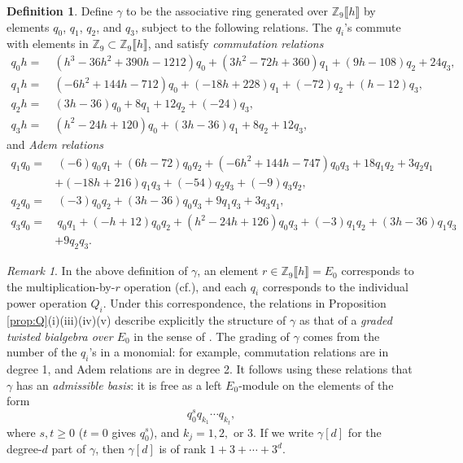 \documentclass{gtpart}
\theoremstyle{definition}
\newtheorem{defn}[thm]{Definition}
\theoremstyle{remark}
\newtheorem{rmk}[thm]{Remark}
\newcommand{\mb}[1]{\mathbb{#1}}
\newcommand{\cf}{cf.\thinspace}
\newcommand{\BZ}{{\mb Z}}
\newcommand{\g}{\gamma}
\begin{document}
\begin{defn}
\label{def:gamma}
 Define $\g$ to be the associative ring generated over $\BZ_9 \llbracket h \rrbracket$ by elements $q_0$, $q_1$, $q_2$, and $q_3$, subject to the following relations.  
 The $q_i$'s commute with elements in $\BZ_9 \subset \BZ_9 \llbracket h \rrbracket$, and satisfy {\em commutation relations} 
 \begin{equation*}
 \begin{split}
  q_0 h = & ~ (h^3 - 36 h^2 + 390 h - 1212) q_0 + (3 h^2 - 72 h + 360) q_1 + (9 h - 108) q_2 + 24 q_3, \\
  q_1 h = & ~ (-6 h^2 + 144 h - 712) q_0 + (-18 h + 228) q_1 + (-72) q_2 + (h - 12) q_3, \\
  q_2 h = & ~ (3 h - 36) q_0 + 8 q_1 + 12 q_2 + (-24) q_3, \\
  q_3 h = & ~ (h^2 - 24 h + 120) q_0 + (3 h - 36) q_1 + 8 q_2 + 12 q_3, 
 \end{split}
 \end{equation*}
 and {\em Adem relations} 
 \begin{equation*}
 \begin{split}
  q_1q_0 = & ~ (-6) q_0q_1 + (6 h - 72) q_0q_2 + (-6 h^2 + 144 h - 747) q_0q_3 + 18 q_1q_2 + 3 q_2q_1 \\
           & + (-18 h + 216) q_1q_3 + (-54) q_2q_3 + (-9) q_3q_2, \\
  q_2q_0 = & ~ (-3) q_0q_2 + (3 h - 36) q_0q_3 + 9 q_1q_3 + 3 q_3q_1, \\
  q_3q_0 = & ~ q_0q_1 + (-h + 12) q_0q_2 + (h^2 - 24 h + 126) q_0q_3 + (-3) q_1q_2 + (3 h - 36) q_1q_3 \\
           & + 9 q_2q_3.  
 \end{split}
 \end{equation*}
\end{defn}

\begin{rmk}
\label{rmk:rank}
 In the above definition of $\g$, an element $r \in \BZ_9 \llbracket h \rrbracket = E_0$ corresponds to the multiplication-by-$r$ operation (\cf \cite[Proposition 6.4]{cong}), 
 and each $q_i$ corresponds to the individual power operation $Q_i$.  
 Under this correspondence, the relations in Proposition \ref{prop:Q}\thinspace (i)(iii)(iv)(v) describe explicitly the structure of $\g$ as 
 that of a {\em graded twisted bialgebra over $E_0$} in the sense of \cite[Section 5]{cong}.  
 The grading of $\g$ comes from the number of the $q_i$'s in a monomial: for example, commutation relations are in degree 1, and Adem relations are in degree 2.  
 It follows using these relations that $\g$ has an {\em admissible basis}: it is free as a left $E_0$-module on the elements of the form 
 \[
  q_0^s q_{k_1} \cdots q_{k_t}, 
 \]
 where $s, t \geq 0$ ($t = 0$ gives $q_0^s$), and $k_j = 1, 2,$ or 3.  
 If we write $\g[d]$ for the degree-$d$ part of $\g$, then $\g[d]$ is of rank $1 + 3 + \cdots + 3^d$.  
\end{rmk}
\end{document}

